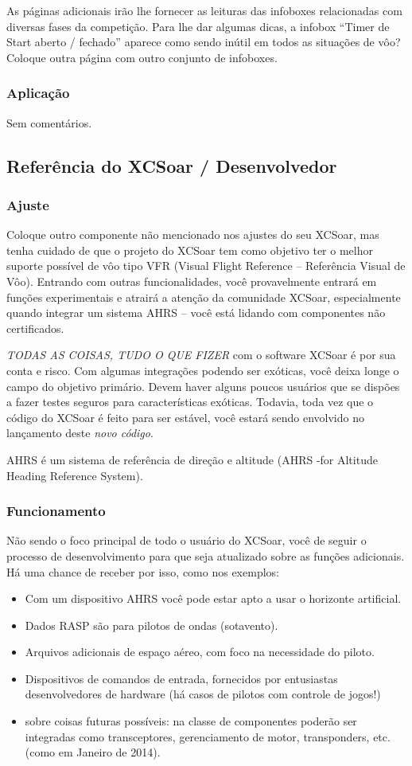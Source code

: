 As páginas adicionais irão lhe fornecer as leituras das infoboxes relacionadas com diversas fases da competição.  Para lhe dar algumas dicas, a infobox “Timer de Start aberto / fechado” aparece como sendo inútil em todos as situações de vôo?  Coloque outra página com outro conjunto de infoboxes.


\subsubsection*{Aplicação}
Sem comentários.

\subsection*{Referência do XCSoar / Desenvolvedor}
\subsubsection*{Ajuste} Coloque outro componente não mencionado nos ajustes do seu XCSoar, mas tenha cuidado de que o projeto do XCSoar tem como objetivo ter o melhor suporte possível de vôo tipo VFR (Visual Flight Reference – Referência Visual de Vôo).  Entrando com outras funcionalidades, você provavelmente entrará em funções experimentais e atrairá a atenção da comunidade XCSoar, especialmente quando integrar um sistema AHRS – você está lidando com componentes não certificados.   

\tip \emph{TODAS AS COISAS, TUDO O QUE FIZER} com o software XCSoar é por sua conta e risco.  Com algumas integrações podendo ser exóticas, você deixa longe o campo do objetivo primário.  Devem haver alguns poucos usuários que se dispões a fazer testes seguros para características exóticas.  Todavia, toda vez que o código do XCSoar é feito para ser estável, você estará sendo envolvido no lançamento deste \emph{novo código}.

AHRS é um sistema de referência de direção e altitude (AHRS -for Altitude Heading Reference System).

\subsubsection*{Funcionamento} Não sendo o foco principal de todo o usuário do XCSoar, você de seguir o processo de desenvolvimento para que seja atualizado sobre as funções adicionais.  Há uma chance de receber por isso, como nos exemplos:
\begin{itemize}
\item Com um dispositivo AHRS você pode estar apto a usar o horizonte artificial.
\item Dados RASP são para pilotos de ondas (sotavento).
\item Arquivos adicionais de espaço aéreo, com foco na necessidade do piloto. 
\item Dispositivos de comandos de entrada, fornecidos por entusiastas desenvolvedores de hardware (há casos de pilotos com controle de jogos!)
\item sobre coisas futuras possíveis: na classe de componentes poderão ser integradas como transceptores, gerenciamento de motor, transponders, etc. (como em Janeiro de 2014).
\end{itemize}

